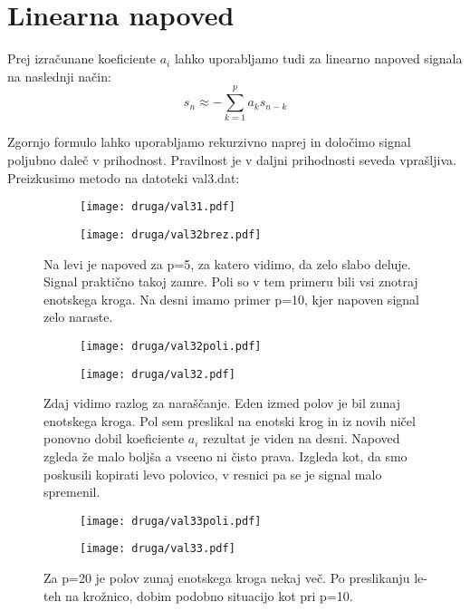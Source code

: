 \documentclass{article}
\begin{document}
\section{Linearna napoved}

Prej izračunane koeficiente $a_i$ lahko uporabljamo tudi za linearno napoved signala na naslednji način:
\begin{equation*}
s_n \approx - \sum_{k=1}^p a_k s_{n-k}
\end{equation*}

Zgornjo formulo lahko uporabljamo rekurzivno naprej in določimo signal poljubno daleč v prihodnost. Pravilnost je v daljni prihodnosti seveda vprašljiva.
Preizkusimo metodo na datoteki val3.dat:

\begin{figure}[H]
\centering
\begin{subfigure}{.49\textwidth}
\texttt{[image: druga/val31.pdf]}
\end{subfigure}
\begin{subfigure}{.49\textwidth}
\texttt{[image: druga/val32brez.pdf]}
\end{subfigure}
\caption*{Na levi je napoved za p=5, za katero vidimo, da zelo slabo deluje. Signal praktično takoj zamre. Poli so v tem primeru bili vsi znotraj enotskega kroga. Na desni imamo primer p=10, kjer napoven signal zelo naraste.}
\end{figure}

\begin{figure}[H]
\centering
\begin{subfigure}{.49\textwidth}
\texttt{[image: druga/val32poli.pdf]}
\end{subfigure}
\begin{subfigure}{.49\textwidth}
\texttt{[image: druga/val32.pdf]}
\end{subfigure}
\caption*{Zdaj vidimo razlog za naraščanje. Eden izmed polov je bil zunaj enotskega kroga. Pol sem preslikal na enotski krog in iz novih ničel ponovno dobil koeficiente $a_i$ rezultat je viden na desni. Napoved zgleda že malo boljša a vseeno ni čisto prava. Izgleda kot, da smo poskusili kopirati levo polovico, v resnici pa se je signal malo spremenil.}
\end{figure}

\begin{figure}[H]
\centering
\begin{subfigure}{.49\textwidth}
\texttt{[image: druga/val33poli.pdf]}
\end{subfigure}
\begin{subfigure}{.49\textwidth}
\texttt{[image: druga/val33.pdf]}
\end{subfigure}
\caption*{Za p=20 je polov zunaj enotskega kroga nekaj več. Po preslikanju le-teh na krožnico, dobim podobno situacijo kot pri p=10.}
\end{figure}
\end{document}
